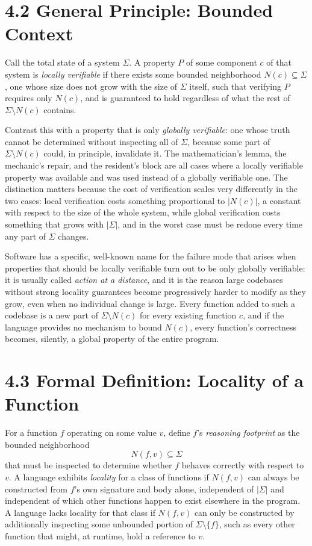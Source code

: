 \documentclass[11pt]{book}
\begin{document}
\section*{4.2 General Principle: Bounded Context}

Call the total state of a system $\Sigma$. A property $P$ of some component $c$ of that system is \emph{locally verifiable} if there exists some bounded neighborhood $N(c) \subseteq \Sigma$, one whose size does not grow with the size of $\Sigma$ itself, such that verifying $P$ requires only $N(c)$, and is guaranteed to hold regardless of what the rest of $\Sigma \setminus N(c)$ contains.

Contrast this with a property that is only \emph{globally verifiable}: one whose truth cannot be determined without inspecting all of $\Sigma$, because some part of $\Sigma \setminus N(c)$ could, in principle, invalidate it. The mathematician's lemma, the mechanic's repair, and the resident's block are all cases where a locally verifiable property was available and was used instead of a globally verifiable one. The distinction matters because the cost of verification scales very differently in the two cases: local verification costs something proportional to $|N(c)|$, a constant with respect to the size of the whole system, while global verification costs something that grows with $|\Sigma|$, and in the worst case must be redone every time any part of $\Sigma$ changes.

Software has a specific, well-known name for the failure mode that arises when properties that should be locally verifiable turn out to be only globally verifiable: it is usually called \emph{action at a distance}, and it is the reason large codebases without strong locality guarantees become progressively harder to modify as they grow, even when no individual change is large. Every function added to such a codebase is a new part of $\Sigma \setminus N(c)$ for every existing function $c$, and if the language provides no mechanism to bound $N(c)$, every function's correctness becomes, silently, a global property of the entire program.

\section*{4.3 Formal Definition: Locality of a Function}

For a function $f$ operating on some value $v$, define $f$'s \emph{reasoning footprint} as the bounded neighborhood
\[
N(f, v) \subseteq \Sigma
\]
that must be inspected to determine whether $f$ behaves correctly with respect to $v$. A language exhibits \emph{locality} for a class of functions if $N(f, v)$ can always be constructed from $f$'s own signature and body alone, independent of $|\Sigma|$ and independent of which other functions happen to exist elsewhere in the program. A language lacks locality for that class if $N(f, v)$ can only be constructed by additionally inspecting some unbounded portion of $\Sigma \setminus \{f\}$, such as every other function that might, at runtime, hold a reference to $v$.
\end{document}
